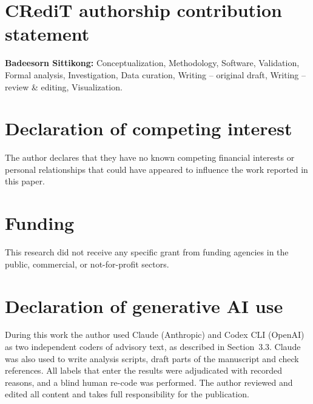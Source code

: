 \documentclass[preprint,12pt]{elsarticle}
\begin{document}
\section*{CRediT authorship contribution statement}
\textbf{Badeesorn Sittikong:} Conceptualization, Methodology, Software, Validation, Formal analysis, Investigation,
Data curation, Writing -- original draft, Writing -- review \& editing, Visualization.

\section*{Declaration of competing interest}
The author declares that they have no known competing financial interests or personal relationships that could have
appeared to influence the work reported in this paper.

\section*{Funding}
This research did not receive any specific grant from funding agencies in the public, commercial, or not-for-profit sectors.

\section*{Declaration of generative AI use}
During this work the author used Claude (Anthropic) and Codex CLI (OpenAI) as two independent coders of
advisory text, as described in Section~3.3. Claude was also used to write analysis scripts, draft
parts of the manuscript and check references. All labels that enter the results were adjudicated with
recorded reasons, and a blind human re-code was performed. The author reviewed and edited all content and
takes full responsibility for the publication.



\end{document}
